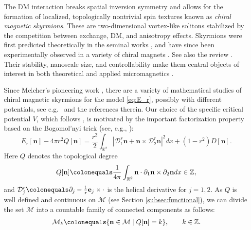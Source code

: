 \documentclass{amsart}
\numberwithin{equation}{section}
\theoremstyle{definition}
\theoremstyle{remark}
\newcommand{\R}{\mathbb{R}}
\newcommand{\Z}{\mathbb{Z}}
\newcommand{\boD}{\mathcal{D}}
\newcommand{\boM}{\mathcal{M}}
\newcommand{\bn}{{\mathbf{n}}}
\newcommand{\boe}{{\mathbf{e}}}
\begin{document}
The DM interaction breaks spatial inversion symmetry and allows for the formation of localized, topologically nontrivial spin textures known as \emph{chiral magnetic skyrmions}.  
These are two-dimensional vortex-like solitons stabilized by the competition between exchange, DM, and anisotropy effects.  
Skyrmions were first predicted theoretically in the seminal works \cite{BogYab89,BogHub94,BogHub94vortex,BogHub1999}, 
and have since been experimentally observed in a variety of chiral magnets \cite{Muhlbauer2009,Yu2010,Yu2011,Leonov2016}. See also the review \cite{NagTok2013}. 
Their stability, nanoscale size, and controllability make them central objects of interest in both theoretical and applied micromagnetics \cite{Romming2013,Fert2013,Fert2017}.




\medskip

Since Melcher's pioneering work \cite{MR3269033}, there are a variety of mathematical studies of chiral magnetic skyrmions for the model \eqref{eq:E_r}, possibly with different potentials, see e.g.\ \cite{MR4489502,MR3639614,MR4179069,MR4105397,MR4204508,MR3853081,MR4961803,MR4945828,MR4091507,MR4677585,deng2025conformal,MR4198719,MR4061310,ibrahim2025global} and the references therein.
Our choice of the specific critical potential $V$, which follows \cite{MR3639614,MR4091507,MR4630481}, is motivated by the important factorization property based on the Bogomol'nyi trick (see, e.g., \cite[Proof of Lemma 2]{MR3639614}):
\begin{equation}\label{e1.1}
E_r [\bn] - 4\pi r^2 Q[\bn] = \frac {r^2}2 \int_{\R^2} |\boD_1^{r} \bn + \bn\times \boD^{r}_2 \bn|^2 dx + (1-r^2) D[\bn].
\end{equation}
Here $Q$ denotes the topological degree
\[
Q[\bn]\colonequals\frac{1}{4\pi}\int_{\R^2} \bn\cdot\partial_1\bn\times\partial_2\bn dx \in \Z,
\]
and $\boD_j^{r}\colonequals\partial_j-\frac{1}{r}\boe_j\times\cdot$ is the helical derivative for $j=1,2$.
As $Q$ is well defined and continuous on $\boM$ (see Section \ref{subsec:functional}), we can divide the set $\boM$ into a countable family of connected components as follows:
\begin{align*}
    \boM_k\colonequals\{ \bn\in\boM \mid Q[\bn]=k\},\qquad k\in\Z.
\end{align*}
\end{document}

